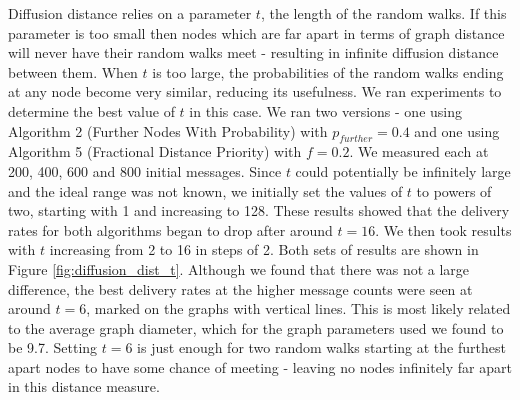 \documentclass[bsc,frontabs,twoside,singlespacing,parskip,deptreport]{infthesis}     %
\begin{document}
Diffusion distance relies on a parameter $t$, the length of the random walks. If this parameter is too small then nodes which are far apart in terms of graph distance will never have their random walks meet - resulting in infinite diffusion distance between them. When $t$ is too large, the probabilities of the random walks ending at any node become very similar, reducing its usefulness. We ran experiments to determine the best value of $t$ in this case. We ran two versions - one using Algorithm 2 (Further Nodes With Probability) with $p_{further}=0.4$ and one using Algorithm 5 (Fractional Distance Priority) with $f=0.2$. We measured each at 200, 400, 600 and 800 initial messages. Since $t$ could potentially be infinitely large and the ideal range was not known, we initially set the values of $t$ to powers of two, starting with 1 and increasing to 128. These results showed that the delivery rates for both algorithms began to drop after around $t=16$. We then took results with $t$ increasing from 2 to 16 in steps of 2. Both sets of results are shown in Figure \ref{fig:diffusion_dist_t}. Although we found that there was not a large difference, the best delivery rates at the higher message counts were seen at around $t=6$, marked on the graphs with vertical lines. This is most likely related to the average graph diameter, which for the graph parameters used we found to be 9.7. Setting $t=6$ is just enough for two random walks starting at the furthest apart nodes to have some chance of meeting - leaving no nodes infinitely far apart in this distance measure.
\end{document}
